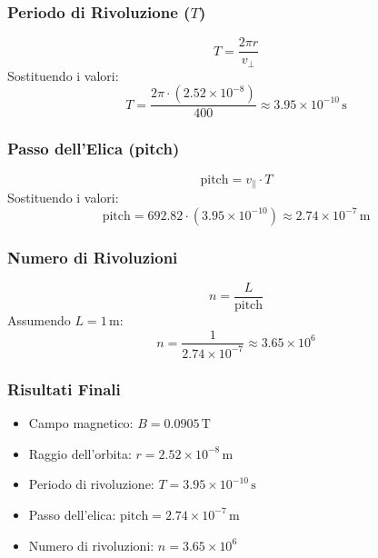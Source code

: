 \documentclass{beamer}
\begin{document}
\begin{frame}
\frametitle{Periodo di Rivoluzione (\(T\))}
\begin{equation}
T = \frac{2 \pi r}{v_\perp}
\end{equation}
Sostituendo i valori:
\begin{equation}
T = \frac{2 \pi \cdot (2.52 \times 10^{-8})}{400} \approx 3.95 \times 10^{-10} \, \text{s}
\end{equation}
\end{frame}

\begin{frame}
\frametitle{Passo dell'Elica (pitch)}
\begin{equation}
\text{pitch} = v_\parallel \cdot T
\end{equation}
Sostituendo i valori:
\begin{equation}
\text{pitch} = 692.82 \cdot (3.95 \times 10^{-10}) \approx 2.74 \times 10^{-7} \, \text{m}
\end{equation}
\end{frame}

\begin{frame}
\frametitle{Numero di Rivoluzioni}
\begin{equation}
n = \frac{L}{\text{pitch}}
\end{equation}
Assumendo \(L = 1 \, \text{m}\):
\begin{equation}
n = \frac{1}{2.74 \times 10^{-7}} \approx 3.65 \times 10^6
\end{equation}
\end{frame}

\begin{frame}
\frametitle{Risultati Finali}
\begin{itemize}
    \item Campo magnetico: \(B = 0.0905 \, \text{T}\)
    \item Raggio dell'orbita: \(r = 2.52 \times 10^{-8} \, \text{m}\)
    \item Periodo di rivoluzione: \(T = 3.95 \times 10^{-10} \, \text{s}\)
    \item Passo dell'elica: \(\text{pitch} = 2.74 \times 10^{-7} \, \text{m}\)
    \item Numero di rivoluzioni: \(n = 3.65 \times 10^6\)
\end{itemize}
\end{frame}
\end{document}

